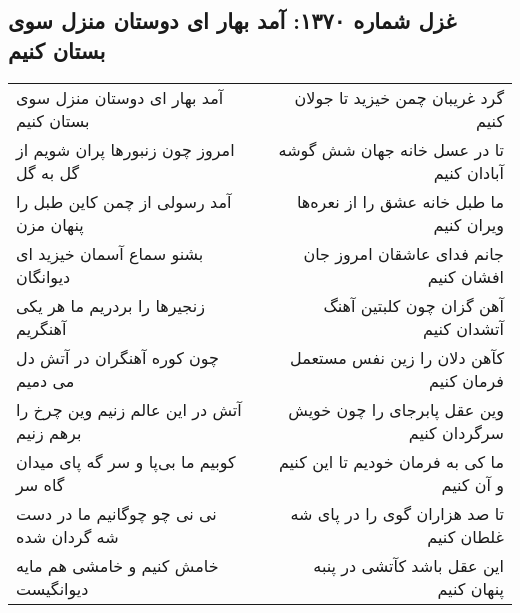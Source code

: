 \begin{center}
\section*{غزل شماره ۱۳۷۰: آمد بهار ای دوستان منزل سوی بستان کنیم}
\label{sec:1370}
\begin{longtable}{l p{0.5cm} r}
آمد بهار ای دوستان منزل سوی بستان کنیم
&&
گرد غریبان چمن خیزید تا جولان کنیم
\\
امروز چون زنبورها پران شویم از گل به گل
&&
تا در عسل خانه جهان شش گوشه آبادان کنیم
\\
آمد رسولی از چمن کاین طبل را پنهان مزن
&&
ما طبل خانه عشق را از نعره‌ها ویران کنیم
\\
بشنو سماع آسمان خیزید ای دیوانگان
&&
جانم فدای عاشقان امروز جان افشان کنیم
\\
زنجیرها را بردریم ما هر یکی آهنگریم
&&
آهن گزان چون کلبتین آهنگ آتشدان کنیم
\\
چون کوره آهنگران در آتش دل می دمیم
&&
کآهن دلان را زین نفس مستعمل فرمان کنیم
\\
آتش در این عالم زنیم وین چرخ را برهم زنیم
&&
وین عقل پابرجای را چون خویش سرگردان کنیم
\\
کوبیم ما بی‌پا و سر گه پای میدان گاه سر
&&
ما کی به فرمان خودیم تا این کنیم و آن کنیم
\\
نی نی چو چوگانیم ما در دست شه گردان شده
&&
تا صد هزاران گوی را در پای شه غلطان کنیم
\\
خامش کنیم و خامشی هم مایه دیوانگیست
&&
این عقل باشد کآتشی در پنبه پنهان کنیم
\\
\end{longtable}
\end{center}
